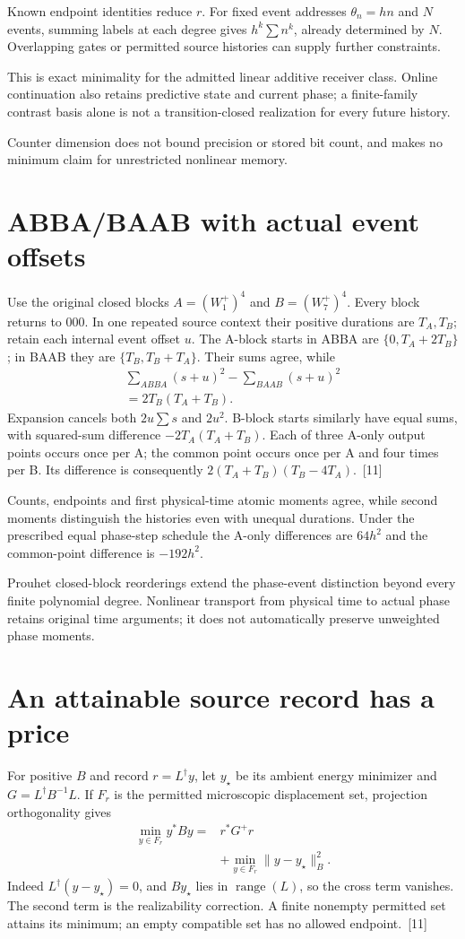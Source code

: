 \documentclass[10pt,twocolumn,letterpaper]{article}
\begin{document}
Known endpoint identities reduce $r$. For fixed event addresses $\theta_n=hn$ and $N$ events, summing labels at each degree gives $h^k\sum n^k$, already determined by $N$. Overlapping gates or permitted source histories can supply further constraints.

This is exact minimality for the admitted linear additive receiver class. Online continuation also retains predictive state and current phase; a finite-family contrast basis alone is not a transition-closed realization for every future history.

Counter dimension does not bound precision or stored bit count, and makes no minimum claim for unrestricted nonlinear memory.

\section{ABBA/BAAB with actual event offsets}
Use the original closed blocks $A=(W_1^+)^4$ and $B=(W_7^+)^4$. Every block returns to 000. In one repeated source context their positive durations are $T_A,T_B$; retain each internal event offset $u$. The A-block starts in ABBA are $\{0,T_A+2T_B\}$; in BAAB they are $\{T_B,T_B+T_A\}$. Their sums agree, while
\[
\begin{aligned}
\sum_{ABBA}(s+u)^2-\sum_{BAAB}(s+u)^2\\
=2T_B(T_A+T_B).
\end{aligned}
\]
Expansion cancels both $2u\sum s$ and $2u^2$. B-block starts similarly have equal sums, with squared-sum difference $-2T_A(T_A+T_B)$. Each of three A-only output points occurs once per A; the common point occurs once per A and four times per B. Its difference is consequently $2(T_A+T_B)(T_B-4T_A)$.~[11]

Counts, endpoints and first physical-time atomic moments agree, while second moments distinguish the histories even with unequal durations. Under the prescribed equal phase-step schedule the A-only differences are $64h^2$ and the common-point difference is $-192h^2$.

Prouhet closed-block reorderings extend the phase-event distinction beyond every finite polynomial degree. Nonlinear transport from physical time to actual phase retains original time arguments; it does not automatically preserve unweighted phase moments.

\section{An attainable source record has a price}
For positive $B$ and record $r=L^\dagger y$, let $y_\star$ be its ambient energy minimizer and $G=L^\dagger B^{-1}L$. If $F_r$ is the permitted microscopic displacement set, projection orthogonality gives
\[
\begin{aligned}
\min_{y\in F_r}y^*By={}&r^*G^+r\\
&+\min_{y\in F_r}\lVert y-y_\star\rVert_B^2.
\end{aligned}
\]
Indeed $L^\dagger(y-y_\star)=0$, and $By_\star$ lies in $\operatorname{range}(L)$, so the cross term vanishes. The second term is the realizability correction. A finite nonempty permitted set attains its minimum; an empty compatible set has no allowed endpoint.~[11]
\end{document}
